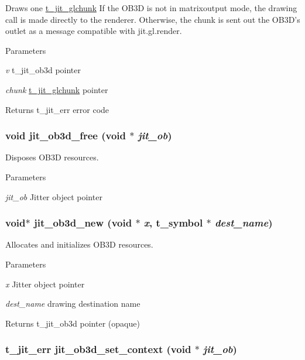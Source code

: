 Draws one \hyperlink{structt__jit__glchunk}{t\_\-jit\_\-glchunk} If the OB3D is not in matrixoutput mode, the drawing call is made directly to the renderer. Otherwise, the chunk is sent out the OB3D's outlet as a message compatible with jit.gl.render.


\begin{DoxyParams}{Parameters}
\item[{\em v}]t\_\-jit\_\-ob3d pointer \item[{\em chunk}]\hyperlink{structt__jit__glchunk}{t\_\-jit\_\-glchunk} pointer\end{DoxyParams}
\begin{DoxyReturn}{Returns}
t\_\-jit\_\-err error code 
\end{DoxyReturn}
\hypertarget{group__ob3dmod_ga5c1537df19c2d7e12ef809d3de3943d9}{
\subsubsection[{jit\_\-ob3d\_\-free}]{\setlength{\rightskip}{0pt plus 5cm}void jit\_\-ob3d\_\-free (void $\ast$ {\em jit\_\-ob})}}
\label{group__ob3dmod_ga5c1537df19c2d7e12ef809d3de3943d9}


Disposes OB3D resources. 
\begin{DoxyParams}{Parameters}
\item[{\em jit\_\-ob}]Jitter object pointer \end{DoxyParams}
\hypertarget{group__ob3dmod_gac27d63b4d66faf27fda165792dafa223}{
\subsubsection[{jit\_\-ob3d\_\-new}]{\setlength{\rightskip}{0pt plus 5cm}void$\ast$ jit\_\-ob3d\_\-new (void $\ast$ {\em x}, \/  {\bf t\_\-symbol} $\ast$ {\em dest\_\-name})}}
\label{group__ob3dmod_gac27d63b4d66faf27fda165792dafa223}


Allocates and initializes OB3D resources. 
\begin{DoxyParams}{Parameters}
\item[{\em x}]Jitter object pointer \item[{\em dest\_\-name}]drawing destination name\end{DoxyParams}
\begin{DoxyReturn}{Returns}
t\_\-jit\_\-ob3d pointer (opaque) 
\end{DoxyReturn}
\hypertarget{group__ob3dmod_ga5e4ab4a85fa076462e640110b8dd678c}{
\subsubsection[{jit\_\-ob3d\_\-set\_\-context}]{\setlength{\rightskip}{0pt plus 5cm}t\_\-jit\_\-err jit\_\-ob3d\_\-set\_\-context (void $\ast$ {\em jit\_\-ob})}}
\label{group__ob3dmod_ga5e4ab4a85fa076462e640110b8dd678c}


